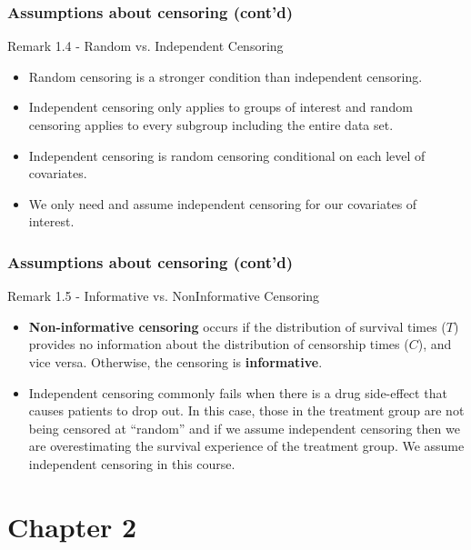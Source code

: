 \documentclass{beamer}
\theoremstyle{definition}
\begin{document}
\begin{frame}
\frametitle{Assumptions about censoring (cont'd)}
\begin{block}{Remark 1.4 - Random vs. Independent Censoring}
\begin{itemize}
\item Random censoring is a stronger condition than independent censoring.
\item Independent censoring only applies to groups of interest and random censoring applies to every subgroup including the entire data set.
\item Independent censoring is random censoring conditional on each level of covariates.
\item We only need and assume independent censoring for our covariates of interest.
\end{itemize}
\end{block}
\end{frame}


\begin{frame}
\frametitle{Assumptions about censoring (cont'd)}
\begin{block}{Remark 1.5 - Informative vs. NonInformative Censoring}
\begin{itemize}
\item \textbf{ Non-informative censoring} occurs if the distribution of survival times ($T$) provides no
information about the distribution of censorship times ($C$), and vice versa. Otherwise, the
censoring is \textbf{informative}.
\item Independent censoring commonly fails when there is a drug side-effect that causes patients to drop out. In this case, those in the treatment group are not being censored at ``random'' and if we assume independent censoring then we are overestimating the survival experience of the treatment group. We assume independent censoring in this course.
\end{itemize}
\end{block}
\end{frame}


\section{Chapter 2}
\end{document}
